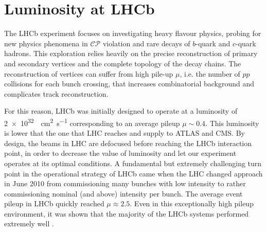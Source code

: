 


\section{Luminosity at LHCb}
The LHCb experiment focuses on investigating heavy flavour physics, probing for new physics phenomena in $\mathcal{CP}$ violation and rare decays of $b$-quark and $c$-quark hadrons. This exploration relies heavily on the precise reconstruction of primary and secondary vertices and the complete topology of the decay chains. The reconstruction of vertices can suffer from high pile-up $\mu$, i.e. the number of $pp$ collisions for each bunch crossing, that increases combinatorial background and complicates track reconstruction.

For this reason, LHCb was initially designed to operate at a luminosity of \SI{2e32}{\per\centi\meter\squared\per\second} corresponding to an average pileup $\mu\sim0.4$. This luminosity is lower that the one that LHC reaches and supply to ATLAS and CMS. By design, the beams in LHC are defocused before reaching the LHCb interaction point, in order to decrease the value of luminosity and let our experiment operates at its optimal conditions. A fundamental but extremely challenging turn point in the operational strategy of LHCb came when the LHC changed approach in June 2010 from commissioning many bunches with low intensity to rather commissioning nominal (and above) intensity per bunch. The average event pileup in LHCb quickly reached $\mu \approx 2.5$. Even in this exceptionally high pileup environment, it was shown that the majority of the LHCb systems performed extremely well \cite{det_perf}.

